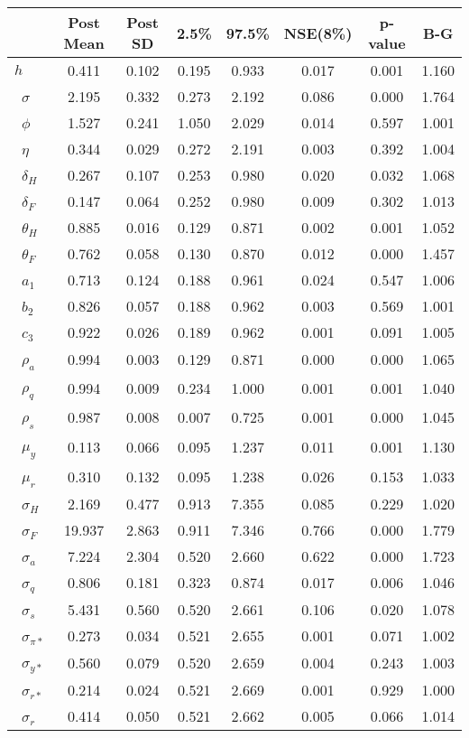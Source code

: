 \begin{tiny}\begin{tabular}{lccccccc}
\hline
&\textbf{Post Mean}&\textbf{Post SD}&\textbf{2.5\%}&\textbf{97.5\%}&\textbf{NSE(8\%)}&\textbf{p-value}&\textbf{B-G}\\\hline
\textbf{$ h             $}&0.411&0.102&0.195&0.933&0.017&0.001&1.160\\\
\textbf{$ \sigma        $}&2.195&0.332&0.273&2.192&0.086&0.000&1.764\\\
\textbf{$ \phi          $}&1.527&0.241&1.050&2.029&0.014&0.597&1.001\\\
\textbf{$ \eta          $}&0.344&0.029&0.272&2.191&0.003&0.392&1.004\\\
\textbf{$ \delta_{H}    $}&0.267&0.107&0.253&0.980&0.020&0.032&1.068\\\
\textbf{$ \delta_{F}    $}&0.147&0.064&0.252&0.980&0.009&0.302&1.013\\\
\textbf{$ \theta_{H}    $}&0.885&0.016&0.129&0.871&0.002&0.001&1.052\\\
\textbf{$ \theta_{F}    $}&0.762&0.058&0.130&0.870&0.012&0.000&1.457\\\
\textbf{$ a_{1}         $}&0.713&0.124&0.188&0.961&0.024&0.547&1.006\\\
\textbf{$ b_{2}         $}&0.826&0.057&0.188&0.962&0.003&0.569&1.001\\\
\textbf{$ c_{3}         $}&0.922&0.026&0.189&0.962&0.001&0.091&1.005\\\
\textbf{$ \rho_{a}      $}&0.994&0.003&0.129&0.871&0.000&0.000&1.065\\\
\textbf{$ \rho_{q}      $}&0.994&0.009&0.234&1.000&0.001&0.001&1.040\\\
\textbf{$ \rho_{s}      $}&0.987&0.008&0.007&0.725&0.001&0.000&1.045\\\
\textbf{$ \mu_{y}       $}&0.113&0.066&0.095&1.237&0.011&0.001&1.130\\\
\textbf{$ \mu_{r}       $}&0.310&0.132&0.095&1.238&0.026&0.153&1.033\\\
\textbf{$ \sigma_{H}    $}&2.169&0.477&0.913&7.355&0.085&0.229&1.020\\\
\textbf{$ \sigma_{F}    $}&19.937&2.863&0.911&7.346&0.766&0.000&1.779\\\
\textbf{$ \sigma_{a}    $}&7.224&2.304&0.520&2.660&0.622&0.000&1.723\\\
\textbf{$ \sigma_{q}    $}&0.806&0.181&0.323&0.874&0.017&0.006&1.046\\\
\textbf{$ \sigma_{s}    $}&5.431&0.560&0.520&2.661&0.106&0.020&1.078\\\
\textbf{$ \sigma_{\pi*} $}&0.273&0.034&0.521&2.655&0.001&0.071&1.002\\\
\textbf{$ \sigma_{y*}   $}&0.560&0.079&0.520&2.659&0.004&0.243&1.003\\\
\textbf{$ \sigma_{r*}   $}&0.214&0.024&0.521&2.669&0.001&0.929&1.000\\\
\textbf{$ \sigma_{r}    $}&0.414&0.050&0.521&2.662&0.005&0.066&1.014\\\hline
\end{tabular}
\end{tiny}
